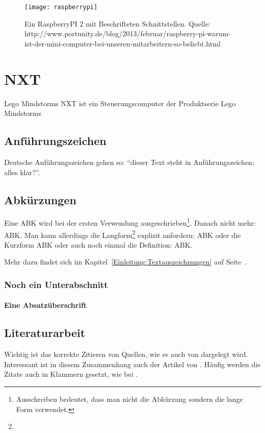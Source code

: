 \begin{figure}[h]
  \centering
  \texttt{[image: raspberrypi]}
  \caption{Ein RaspberryPI 2 mit Beschrifteten Schnittstellen. Quelle: http://www.portunity.de/blog/2013/februar/raspberry-pi-warum-ist-der-mini-computer-bei-unseren-mitarbeitern-so-beliebt.html}
  \label{Kap1:RaspberryPI}
\end{figure}

\section{NXT}
\label{Grundlagen:NXT}

Lego Mindstorms NXT ist ein Steuerungscomputer der Produktserie Lego Mindstorms



\subsection{Anführungszeichen}

Deutsche Anführungszeichen gehen so: "`dieser Text steht in \glq Anführungszeichen\grq; alles klar?"'.


\subsection{Abkürzungen}

Eine \ac{ABK} wird bei der ersten Verwendung ausgeschrieben\footnote{Ausschreiben bedeutet, dass man nicht die Abkürzung sondern die lange Form verwendet.}. Danach nicht mehr: \ac{ABK}. Man kann allerdings die Langform\footnote{\blindtext} explizit anfordern: \acl{ABK} oder die Kurzform \acs{ABK} oder auch noch einmal die Definition: \acf{ABK}.

Mehr dazu findet sich im Kapitel~\ref{Einleitung:Textauszeichnungen} auf Seite~\pageref{Einleitung:Textauszeichnungen}.


\subsubsection{Noch ein Unterabschnitt}

\paragraph{Eine Absatzüberschrift}
\blindtext[1]


\subsection{Literaturarbeit}

Wichtig ist das korrekte Zitieren von Quellen, wie es auch von \cite{Kornmeier2011} dargelegt wird. Interessant ist in diesem Zusammenhang auch der Artikel von \cite{Vixie2007}. Häufig werden die Zitate auch in Klammern gesetzt, wie bei \citep{Kornmeier2011}.

\blindtext[4]